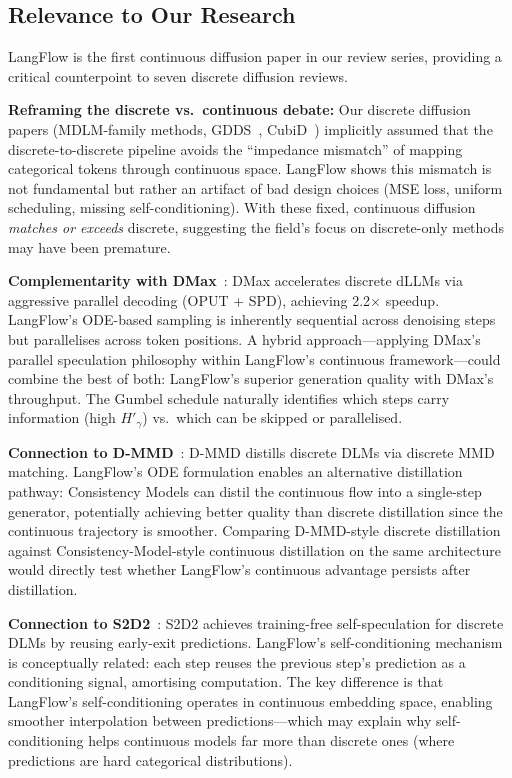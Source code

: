 \documentclass[11pt]{article}
\begin{document}
\subsection{Relevance to Our Research}

LangFlow is the first continuous diffusion paper in our review series, providing a critical counterpoint to seven discrete diffusion reviews.

\textbf{Reframing the discrete vs.\ continuous debate:} Our discrete diffusion papers (MDLM-family methods, GDDS~\cite{gdds}, CubiD~\cite{cubid}) implicitly assumed that the discrete-to-discrete pipeline avoids the ``impedance mismatch'' of mapping categorical tokens through continuous space. LangFlow shows this mismatch is not fundamental but rather an artifact of bad design choices (MSE loss, uniform scheduling, missing self-conditioning). With these fixed, continuous diffusion \textit{matches or exceeds} discrete, suggesting the field's focus on discrete-only methods may have been premature.

\textbf{Complementarity with DMax}~\cite{dmax}: DMax accelerates discrete dLLMs via aggressive parallel decoding (OPUT + SPD), achieving 2.2$\times$ speedup. LangFlow's ODE-based sampling is inherently sequential across denoising steps but parallelises across token positions. A hybrid approach---applying DMax's parallel speculation philosophy within LangFlow's continuous framework---could combine the best of both: LangFlow's superior generation quality with DMax's throughput. The Gumbel schedule naturally identifies which steps carry information (high $H'_\gamma$) vs.\ which can be skipped or parallelised.

\textbf{Connection to D-MMD}~\cite{dmmd}: D-MMD distills discrete DLMs via discrete MMD matching. LangFlow's ODE formulation enables an alternative distillation pathway: Consistency Models can distil the continuous flow into a single-step generator, potentially achieving better quality than discrete distillation since the continuous trajectory is smoother. Comparing D-MMD-style discrete distillation against Consistency-Model-style continuous distillation on the same architecture would directly test whether LangFlow's continuous advantage persists after distillation.

\textbf{Connection to S2D2}~\cite{s2d2}: S2D2 achieves training-free self-speculation for discrete DLMs by reusing early-exit predictions. LangFlow's self-conditioning mechanism is conceptually related: each step reuses the previous step's prediction as a conditioning signal, amortising computation. The key difference is that LangFlow's self-conditioning operates in continuous embedding space, enabling smoother interpolation between predictions---which may explain why self-conditioning helps continuous models far more than discrete ones (where predictions are hard categorical distributions).
\end{document}
